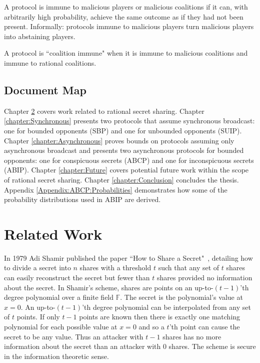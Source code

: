\documentclass[12pt]{dalcsthesis}
\begin{document}
A protocol is immune to malicious players or malicious coalitions if it can, with arbitrarily high probability, achieve the same outcome as if they had not been present. Informally: protocols immune to malicious players turn malicious players into abstaining players.

A protocol is ``coalition immune" when it is immune to malicious coalitions and immune to rational coalitions.

\section{Document Map}

Chapter \ref{chapter:RelatedWork} covers work related to rational secret sharing. Chapter \ref{chapter:Synchronous} presents two protocols that assume synchronous broadcast: one for bounded opponents (SBP) and one for unbounded opponents (SUIP). Chapter \ref{chapter:Asynchronous} proves bounds on protocols assuming only asynchronous broadcast and presents two asynchronous protocols for bounded opponents: one for conspicuous secrets (ABCP) and one for inconspicuous secrets (ABIP). Chapter \ref{chapter:Future} covers potential future work within the scope of rational secret sharing. Chapter \ref{chapter:Conclusion} concludes the thesis. Appendix \ref{Appendix:ABCP:Probabilities} demonstrates how some of the probability distributions used in ABIP are derived.




\chapter{Related Work}
\label{chapter:RelatedWork}

In 1979 Adi Shamir published the paper ``How to Share a Secret"~\cite{shamir79}, detailing how to divide a secret into $n$ shares with a threshold $t$ such that any set of $t$ shares can easily reconstruct the secret but fewer than $t$ shares provided no information about the secret. In Shamir's scheme, shares are points on an up-to-$(t-1)$'th degree polynomial over a finite field $\mathbb{F}$. The secret is the polynomial's value at $x=0$. An up-to-$(t-1)$'th degree polynomial can be interpolated from any set of $t$ points. If only $t-1$ points are known then there is exactly one matching polynomial for each possible value at $x=0$ and so a $t$'th point can cause the secret to be any value. Thus an attacker with $t-1$ shares has no more information about the secret than an attacker with $0$ shares. The scheme is secure in the information theoretic sense.
\end{document}
